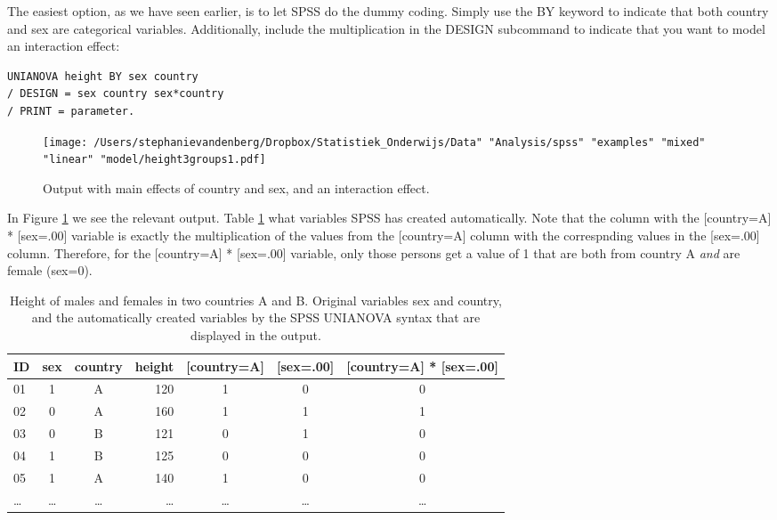 The easiest option, as we have seen earlier, is to let SPSS do the dummy coding. Simply use the BY keyword to indicate that both country and sex are categorical variables. Additionally, include the multiplication in the DESIGN subcommand to indicate that you want to model an interaction effect:

\begin{verbatim}
UNIANOVA height BY sex country 
/ DESIGN = sex country sex*country
/ PRINT = parameter.
\end{verbatim}


\begin{figure}[h]
    \begin{center}
       \texttt{[image: /Users/stephanievandenberg/Dropbox/Statistiek\_Onderwijs/Data" "Analysis/spss" "examples" "mixed" "linear" "model/height3groups1.pdf]}
    \end{center}
    \caption{Output with main effects of country and sex, and an interaction effect.}
     \label{fig:interactionheightcountrysex}
\end{figure}

In Figure \ref{fig:interactionheightcountrysex} we see the relevant output. Table \ref{tab:2countries} what variables SPSS has created automatically. Note that the column with the [country=A] * [sex=.00] variable is exactly the multiplication of the values from the [country=A] column with the correspnding values in the [sex=.00] column. Therefore, for the [country=A] * [sex=.00] variable, only those persons get a value of 1 that are both from country A \textit{and} are female (sex=0). 


\begin{table}
 \caption{Height of males and females in two countries A and B. Original variables sex and country, and the automatically created variables by the SPSS UNIANOVA syntax that are displayed in the output.}
 \begin{tabular}{lccrccc}
 ID & sex & country & height &  [country=A] & [sex=.00] &[country=A] * [sex=.00]      \\ \hline
 01 & 1 & A & 120 &  1 &0 & 0         \\
 02 & 0 & A & 160 &   1&1 & 1        \\
 03 & 0 & B & 121 &  0 &1& 0       \\
 04 & 1 & B & 125 &  0 &0 &0          \\
 05 & 1 & A & 140 &  1 &0 & 0       \\
 \dots & \dots & \dots & \dots &\dots   & \dots&  \dots       \\
 \end{tabular}
 \label{tab:2countries}
 \end{table}



